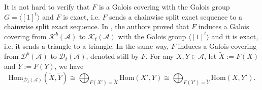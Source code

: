 \documentclass{amsart}
\theoremstyle{definition}
\numberwithin{equation}{section}
\begin{document}
It is not hard to verify that $F$ is a Galois covering with the
Galois group $G=\langle[1]^t\rangle$ and $F$ is exact, i.e. $F$
sends a chainwise split exact sequence to a chainwise split exact
sequence. In \cite{PX1997}, the authors proved that $F$ induces a
Galois covering from $\mathcal{K}^b(\mathcal{A})$ to
$\mathcal{K}_t(\mathcal{A})$ with the Galois group
$\langle[1]^t\rangle$ and it is exact, i.e. it sends a triangle to a
triangle. In the same way, $F$ induces a Galois covering from
$\mathcal{D}^b(\mathcal{A})$ to $\mathcal{D}_t(\mathcal{A})$,
denoted still by $F.$ For any $X, Y\in \mathcal{A}$, let
$\tilde{X}:=F(X)$ and $\tilde{Y}:=F(Y)$, we have
\begin{equation}\label{isomorphism}
{\mathrm{Hom}}_{{{\mathcal{D}}}_t(\mathcal{A})}(\tilde{X}, \tilde{Y})\cong
\bigoplus_{F(X')=\tilde{X}}{\mathrm{Hom}}(X', Y)\cong
\bigoplus_{F(Y')=\tilde{Y}}{\mathrm{Hom}}(X, Y').
\end{equation}
\end{document}
